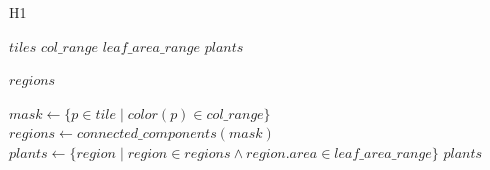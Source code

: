\documentclass[12pt,a4paper,oneside]{report}
\begin{document}
\begin{algorithm}
    \caption{H1}
    \label{alg:H1}
    \begin{algorithmic}[1]
    \Require $tiles$ 
    \Require $col\_range$ 
    \Require $leaf\_area\_range$ 
    \Ensure $plants$ 
    
     \cite{wuOptimizingConnectedComponent2005} 
        \State \Return $regions$
    \EndFunction
    
      \State $mask \gets \{p \in tile \mid color(p) \in col\_range\}$
      \State $regions \gets connected\_components(mask)$
      \State $plants \gets \{region \mid region \in regions \land region.area \in leaf\_area\_range\}$
    \EndFor
    \State \Return $plants$
  \end{algorithmic}
  \end{algorithm}
  
\end{document}
